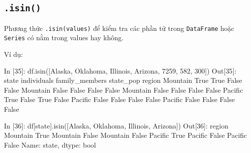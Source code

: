 \documentclass[
]{book}
\newenvironment{Shaded}{\begin{snugshade}}{\end{snugshade}}
\newcommand{\BuiltInTok}[1]{#1}
\newcommand{\DecValTok}[1]{\textcolor[rgb]{0.00,0.00,0.81}{#1}}
\newcommand{\NormalTok}[1]{#1}
\newcommand{\StringTok}[1]{\textcolor[rgb]{0.31,0.60,0.02}{#1}}
\newcommand{\VariableTok}[1]{\textcolor[rgb]{0.00,0.00,0.00}{#1}}
\begin{document}
\subsection{\texorpdfstring{\texttt{.isin()}}{.isin()}}\label{isin}

Phương thức \texttt{.isin(values)} để kiểm tra các phần tử trong \texttt{DataFrame} hoặc \texttt{Series} có nằm trong values hay không.

Ví dụ:

\begin{Shaded}
\begin{Highlighting}[]
\NormalTok{In [}\DecValTok{35}\NormalTok{]: df.isin([}\StringTok{\textquotesingle{}Alaska\textquotesingle{}}\NormalTok{, }\StringTok{\textquotesingle{}Oklahoma\textquotesingle{}}\NormalTok{, }\StringTok{\textquotesingle{}Illinois\textquotesingle{}}\NormalTok{, }\StringTok{\textquotesingle{}Arizona\textquotesingle{}}\NormalTok{, }\DecValTok{7259}\NormalTok{, }\DecValTok{582}\NormalTok{, }\DecValTok{300}\NormalTok{])}
\NormalTok{Out[}\DecValTok{35}\NormalTok{]:}
\NormalTok{          state  individuals  family\_members  state\_pop}
\NormalTok{region                                                 }
\NormalTok{Mountain   }\VariableTok{True}         \VariableTok{True}           \VariableTok{False}      \VariableTok{False}
\NormalTok{Mountain  }\VariableTok{False}        \VariableTok{False}           \VariableTok{False}      \VariableTok{False}
\NormalTok{Mountain  }\VariableTok{False}        \VariableTok{False}           \VariableTok{False}      \VariableTok{False}
\NormalTok{Pacific    }\VariableTok{True}        \VariableTok{False}            \VariableTok{True}      \VariableTok{False}
\NormalTok{Pacific   }\VariableTok{False}        \VariableTok{False}           \VariableTok{False}      \VariableTok{False}
\NormalTok{Pacific   }\VariableTok{False}        \VariableTok{False}           \VariableTok{False}      \VariableTok{False}

\NormalTok{In [}\DecValTok{36}\NormalTok{]: df[}\StringTok{\textquotesingle{}state\textquotesingle{}}\NormalTok{].isin([}\StringTok{\textquotesingle{}Alaska\textquotesingle{}}\NormalTok{, }\StringTok{\textquotesingle{}Oklahoma\textquotesingle{}}\NormalTok{, }\StringTok{\textquotesingle{}Illinois\textquotesingle{}}\NormalTok{, }\StringTok{\textquotesingle{}Arizona\textquotesingle{}}\NormalTok{])}
\NormalTok{Out[}\DecValTok{36}\NormalTok{]:}
\NormalTok{region}
\NormalTok{Mountain     }\VariableTok{True}
\NormalTok{Mountain    }\VariableTok{False}
\NormalTok{Mountain    }\VariableTok{False}
\NormalTok{Pacific      }\VariableTok{True}
\NormalTok{Pacific     }\VariableTok{False}
\NormalTok{Pacific     }\VariableTok{False}
\NormalTok{Name: state, dtype: }\BuiltInTok{bool}
\end{Highlighting}
\end{Shaded}
\end{document}

